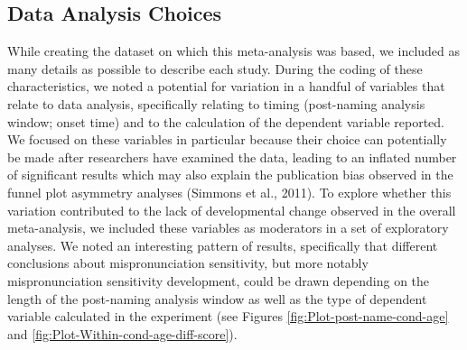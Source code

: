 \documentclass[man]{apa6}
\theoremstyle{definition}
\theoremstyle{definition}
\theoremstyle{definition}
\theoremstyle{remark}
\begin{document}
\subsection{Data Analysis Choices}\label{data-analysis-choices}

While creating the dataset on which this meta-analysis was based, we
included as many details as possible to describe each study. During the
coding of these characteristics, we noted a potential for variation in a
handful of variables that relate to data analysis, specifically relating
to timing (post-naming analysis window; onset time) and to the
calculation of the dependent variable reported. We focused on these
variables in particular because their choice can potentially be made
after researchers have examined the data, leading to an inflated number
of significant results which may also explain the publication bias
observed in the funnel plot asymmetry analyses (Simmons et al., 2011).
To explore whether this variation contributed to the lack of
developmental change observed in the overall meta-analysis, we included
these variables as moderators in a set of exploratory analyses. We noted
an interesting pattern of results, specifically that different
conclusions about mispronunciation sensitivity, but more notably
mispronunciation sensitivity development, could be drawn depending on
the length of the post-naming analysis window as well as the type of
dependent variable calculated in the experiment (see Figures
\ref{fig:Plot-post-name-cond-age} and
\ref{fig:Plot-Within-cond-age-diff-score}).
\end{document}
